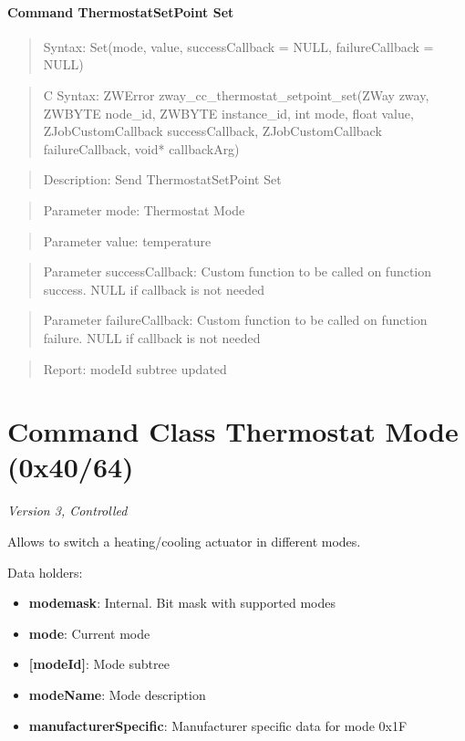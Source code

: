 \paragraph{Command ThermostatSetPoint Set}
\begin{quote}Syntax: Set(mode, value, successCallback = NULL, failureCallback = NULL)\end{quote}
\begin{quote}C Syntax: ZWError zway\_cc\_thermostat\_setpoint\_set(ZWay zway, ZWBYTE node\_id, ZWBYTE instance\_id, int mode, float value, ZJobCustomCallback successCallback, ZJobCustomCallback failureCallback, void* callbackArg)\end{quote}
\begin{quote}Description: Send ThermostatSetPoint Set\end{quote}
\begin{quote}Parameter mode: Thermostat Mode\end{quote}
\begin{quote}Parameter value: temperature\end{quote}
\begin{quote}Parameter successCallback: Custom function to be called on function success. NULL if callback is not needed\end{quote}
\begin{quote}Parameter failureCallback: Custom function to be called on function failure. NULL if callback is not needed\end{quote}
\begin{quote}Report: modeId subtree updated\end{quote}


\section{Command Class Thermostat Mode (0x40/64)}

\textit{Version 3, Controlled}
\newline

Allows to switch a heating/cooling actuator in different modes.
\newline

\noindent
Data holders:

\begin{itemize}
\item \textbf{modemask}: Internal. Bit mask with supported modes
\item \textbf{mode}: Current mode
\item \textbf{[modeId]}: Mode subtree
\item \qquad\textbf{modeName}: Mode description
\item \textbf{manufacturerSpecific}: Manufacturer specific data for mode 0x1F
\end{itemize}


